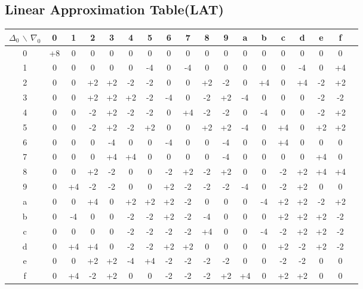 \documentclass{article}
\begin{document}
\subsection{Linear Approximation Table(LAT)}
\begin{tabular}{c||c c c c c c c c c c c c c c c c c|}
	$\Delta_0$ $\backslash$ $\nabla_0$ &0 &1 & 2 & 3 &4&5&6&7&8&9&a&b&c&d&e&f\\
	\hline\hline
0 &  +8 &  0 &  0 &  0 &  0 &  0 &  0 &  0 &  0 &  0 &  0 &  0 &  0  & 0 &  0 &  0 \\
1 &   0 &  0  & 0 &  0 &  0 & -4 &  0 & -4 &  0 &  0 &  0 &  0 &  0 & -4 &  0 & +4 \\
2 &   0  & 0&  +2 & +2 & -2 & -2 &  0 &  0 & +2 & -2 &  0 & +4 &  0 & +4 & -2 & +2 \\
3 &   0  & 0 & +2 & +2 & +2 & -2 & -4 &  0 & -2 & +2 & -4 &  0 &  0 &  0 & -2 & -2 \\
4 &   0  & 0 & -2 & +2 & -2 & -2 &  0 & +4 & -2 & -2 &  0 & -4 &  0 &  0 & -2 & +2 \\
5 &   0  & 0 & -2 & +2 & -2 & +2 &  0 &  0 & +2 & +2 & -4 &  0 & +4 &  0 & +2 & +2 \\
6 &   0   &0 &  0 & -4 &  0 &  0 & -4 &  0 &  0 & -4 &  0 &  0 & +4 &  0 &  0 &  0 \\
7 &   0   &0 &  0 & +4 & +4 &  0 &  0 &  0 &  0 & -4 &  0 &  0 &  0 &  0 & +4 &  0 \\
8 &   0 &  0 & +2 & -2 &  0 &  0 & -2 & +2 & -2 & +2 &  0 &  0 & -2 & +2 & +4 & +4 \\
9 &   0 & +4 & -2 & -2 &  0 &  0 & +2 & -2 & -2 & -2 & -4  & 0 & -2 & +2 &  0 &  0 \\
a &   0 &  0 & +4 &  0 & +2 & +2 & +2 & -2 &  0 &  0 &  0 & -4 & +2 & +2 & -2 & +2 \\
b &   0  &-4 &  0 &  0 & -2 & -2 & +2 & -2 & -4 &  0 &  0  & 0 & +2 & +2 & +2 & -2 \\
c &   0  & 0 &  0 &  0 & -2 & -2 & -2 & -2 & +4 &  0 &  0 & -4 & -2 & +2 & +2 & -2 \\
d &   0 & +4 & +4 &  0 & -2 & -2 & +2 & +2 &  0 &  0 &  0 &  0 & +2 & -2 & +2 & -2 \\
e &   0  & 0 & +2 & +2 & -4 & +4 & -2 & -2 & -2 & -2 &  0 &  0 & -2 & -2 &  0 &  0 \\
f &   0  &+4 & -2 & +2 &  0 &  0 & -2  &-2 & -2 & +2 & +4 &  0 & +2 & +2  & 0 &  0 \\
\end{tabular}
\end{document}

